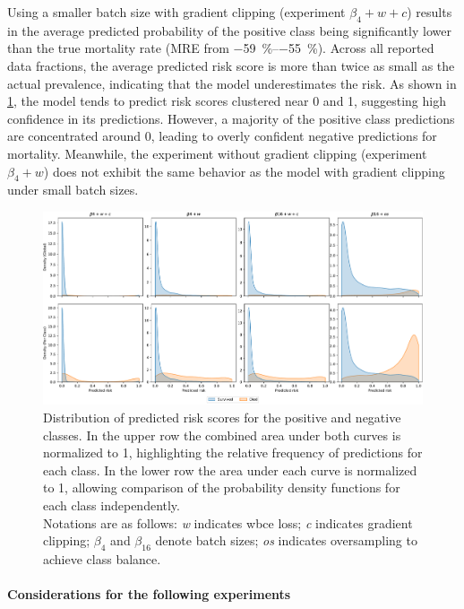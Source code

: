 Using a smaller batch size with gradient clipping (experiment $\beta_{4} + w + c$) results in the average predicted probability of the positive class being significantly lower than the true mortality rate (MRE from \qtyrange{-59}{-55}{\percent}). Across all reported data fractions, the average predicted risk score is more than twice as small as the actual prevalence, indicating that the model underestimates the risk. As shown in \cref{fig:risk_score_distributions}, the model tends to predict risk scores clustered near 0 and 1, suggesting high confidence in its predictions. However, a majority of the positive class predictions are concentrated around 0, leading to overly confident negative predictions for mortality. Meanwhile, the experiment without gradient clipping (experiment $\beta_{4} + w$) does not exhibit the same behavior as the model with gradient clipping under small batch sizes.

\begin{figure}
    \centering
    \includegraphics[width=\textwidth]{./figures/risk_score_distributions}
    \caption{Distribution of predicted risk scores for the positive and negative classes.
    In the upper row the combined area under both curves is normalized to 1, highlighting the relative frequency of predictions for each class.
    In the lower row the area under each curve is normalized to 1, allowing comparison of the probability density functions for each class independently. \\
    Notations are as follows: \emph{w} indicates \gls{wbce} loss; \emph{c} indicates gradient clipping; $\beta_{4}$ and $\beta_{16}$ denote batch sizes; \emph{os} indicates oversampling to achieve class balance.}
    \label{fig:risk_score_distributions}
\end{figure}

\paragraph{Considerations for the following experiments}

